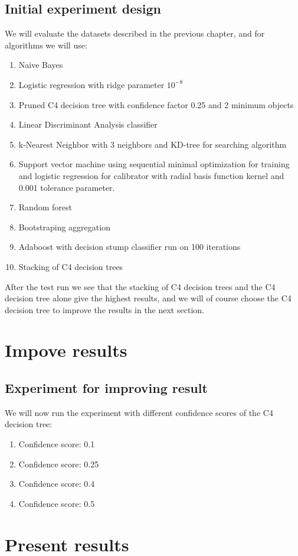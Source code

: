 \section{Initial experiment design}
We will evaluate the datasets described in the previous chapter, and for algorithms we will use:
\begin{enumerate}
    \item Naive Bayes
    \item Logistic regression with ridge parameter $10^{-8}$
    \item Pruned C4 decision tree with confidence factor 0.25 and 2 minimum objects
    \item Linear Discriminant Analysis classifier
    \item k-Nearest Neighbor with 3 neighbors and KD-tree for searching algorithm
    \item Support vector machine using sequential minimal optimization for training and logistic regression for calibrator with radial basis function kernel and 0.001 tolerance parameter.
    \item Random forest
    \item Bootstraping aggregation
    \item Adaboost with decision stump classifier run on 100 iterations
    \item Stacking of C4 decision trees
\end{enumerate}
After the test run we see \cite{repo} that the stacking of C4 decision trees and the C4 decision tree alone give the highest results, and we will of course choose the C4 decision tree to improve the results in the next section.

\chapter{Impove results}
\section{Experiment for improving result}
We will now run the experiment with different confidence scores of the C4 decision tree:
\begin{enumerate}
    \item Confidence score: 0.1
    \item Confidence score: 0.25
    \item Confidence score: 0.4
    \item Confidence score: 0.5
\end{enumerate}


\chapter{Present results}